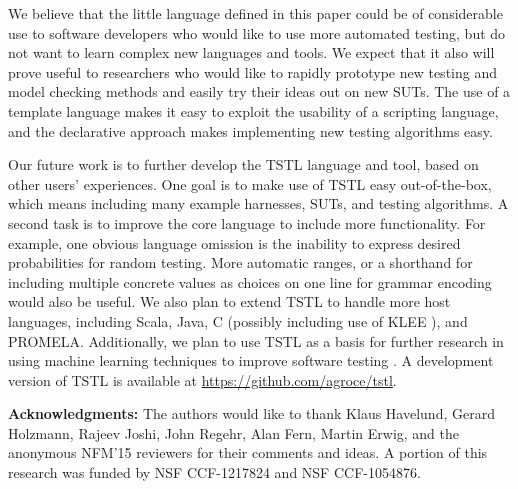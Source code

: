 \documentclass[runningheads,a4paper]{llncs}
\begin{document}
We believe that the little language defined in this paper could be of
considerable use to software developers who would like to use more
automated testing, but do not want to learn complex new languages and
tools.  We expect that it also will prove useful to researchers who
would like to rapidly prototype new testing and model checking methods
and easily try their ideas out on new SUTs.  The use of a template
language makes it easy to exploit the usability of a scripting
language, and the declarative approach makes implementing new
testing algorithms easy.

Our future work is to further develop the TSTL language and tool,
based on other users' experiences.  One goal is to make use of TSTL
easy out-of-the-box, which means including many example harnesses,
SUTs, and testing algorithms.  A second task is to improve the core
language to include more functionality.  For example, one obvious
language omission is the inability to express desired probabilities
for random testing.  More automatic ranges, or a shorthand for
including multiple concrete values as choices on one line for grammar
encoding would also be useful.  We also plan to extend TSTL to handle
more host languages, including Scala, Java, C (possibly including use
of KLEE \cite{KLEE}), and PROMELA.  Additionally, we plan to use TSTL
as a basis for further research in using machine learning techniques
to improve software testing \cite{ISOLA12}.  A development version of
TSTL is available at \url{https://github.com/agroce/tstl}.

{\bf Acknowledgments:} The authors would like to thank Klaus Havelund,
Gerard Holzmann, Rajeev Joshi, John Regehr, Alan Fern, Martin Erwig,
and the anonymous NFM'15 reviewers for their comments and ideas.  A
portion of this research was funded by NSF CCF-1217824 and NSF
CCF-1054876.




\end{document}
